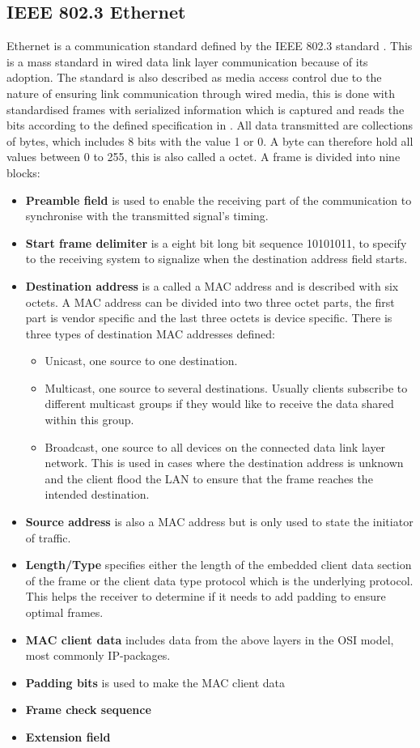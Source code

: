 \subsection{IEEE 802.3 Ethernet}
Ethernet is a communication standard defined by the IEEE 802.3 standard \cite{802.3}. This is a mass standard in wired data link layer communication because of its adoption. The standard is also described as media access control due to the nature of ensuring link communication through wired media, this is done with standardised frames with serialized information which is captured and reads the bits according to the defined specification in \cite{802.3}. All data transmitted are collections of bytes, which includes 8 bits with the value 1 or 0. A byte can therefore hold all values between 0 to 255, this is also called a octet. A frame is divided into nine blocks: 
\begin{itemize}
    \item \textbf{Preamble field} is used to enable the receiving part of the communication to synchronise with the transmitted signal's timing.
    \item \textbf{Start frame delimiter} is a eight bit long bit sequence 10101011, to specify to the receiving system to signalize when the destination address field starts. 
    \item \textbf{Destination address} is a called a MAC address \cite{macaddress} and is described with six octets. A MAC address can be divided into two three octet parts, the first part is vendor specific and the last three octets is device specific. There is three types of destination MAC addresses defined: 
    \begin{itemize}
        \item Unicast, one source to one destination. 
        \item Multicast, one source to several destinations. Usually clients subscribe to different multicast groups if they would like to receive the data shared within this group. 
        \item Broadcast, one source to all devices on the connected data link layer network. This is used in cases where the destination address is unknown and the client flood the LAN to ensure that the frame reaches the intended destination. 
    \end{itemize}
    \item \textbf{Source address} is also a MAC address but is only used to state the initiator of traffic. 
    \item \textbf{Length/Type} specifies either the length of the embedded client data section of the frame or the client data type protocol which is the underlying protocol. This helps the receiver to determine if it needs to add padding to ensure optimal frames. 
    \item \textbf{MAC client data} includes data from the above layers in the OSI model, most commonly IP-packages. 
    \item \textbf{Padding bits} is used to make the MAC client data 
    \item \textbf{Frame check sequence}
    \item \textbf{Extension field}
\end{itemize}

